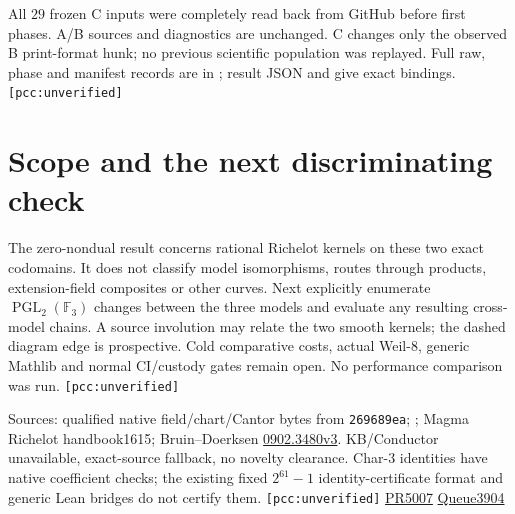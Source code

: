 \documentclass[10pt,a4paper]{article}
\newcommand{\uv}{\texttt{[pcc:unverified]}}
\begin{document}
All $29$ frozen C inputs were completely read back from GitHub before
first phases. A/B sources and diagnostics are unchanged. C changes only
the observed B print-format hunk; no previous scientific population was
replayed. Full raw, phase and manifest records are in
; result JSON and
 give exact bindings. \uv

\section{Scope and the next discriminating check}
The zero-nondual result concerns rational Richelot kernels on these two
exact codomains. It does not classify model isomorphisms, routes through
products, extension-field composites or other curves. Next explicitly
enumerate $\operatorname{PGL}_2(\mathbb F_3)$ changes between the three
models and evaluate any resulting cross-model chains. A source involution
may relate the two smooth kernels; the dashed diagram edge is prospective.
Cold comparative costs, actual Weil-$8$, generic Mathlib and normal
CI/custody gates remain open. No performance comparison was run. \uv

\begin{flushleft}\footnotesize
Sources: qualified native field/chart/Cantor bytes from \texttt{269689ea};
; Magma Richelot handbook1615;
Bruin--Doerksen \href{https://arxiv.org/abs/0902.3480}{0902.3480v3}.
KB/Conductor unavailable, exact-source fallback, no novelty clearance.
Char-$3$ identities have native coefficient checks; the existing fixed
$2^{61}-1$ identity-certificate format and generic Lean bridges do not
certify them. \uv\quad
\href{https://github.com/isogeny-labs/crypto/pull/5007}{PR5007}\quad
\href{https://github.com/isogeny-labs/crypto/issues/3904}{Queue3904}
\end{flushleft}
\end{document}
